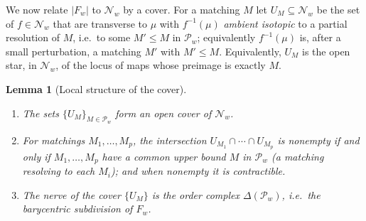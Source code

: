 \documentclass[11pt]{article}
\newtheorem{lemma}{Lemma}
\theoremstyle{definition}
\theoremstyle{remark}
\begin{document}
We now relate $|F_w|$ to $\mathcal N_w$ by a cover. For a matching $M$ let
$U_M\subseteq\mathcal N_w$ be the set of $f\in\mathcal N_w$ that are transverse to
$\mu$ with $f^{-1}(\mu)$ \emph{ambient isotopic} to a partial resolution of $M$,
i.e.\ to some $M'\le M$ in $\mathcal P_w$; equivalently $f^{-1}(\mu)$ is, after a
small perturbation, a matching $M'$ with $M'\le M$. Equivalently, $U_M$ is the
open star, in $\mathcal N_w$, of the locus of maps whose preimage is exactly $M$.

\begin{lemma}[Local structure of the cover]\label{lem:cover}
\leavevmode
\begin{enumerate}
\item[(a)] The sets $\{U_M\}_{M\in\mathcal P_w}$ form an open cover of $\mathcal
N_w$.
\item[(b)] For matchings $M_1,\dots,M_p$, the intersection $U_{M_1}\cap\cdots\cap
U_{M_p}$ is nonempty if and only if $M_1,\dots,M_p$ have a common upper bound
$M$ in $\mathcal P_w$ (a matching resolving to each $M_i$); and when nonempty it
is contractible.
\item[(c)] The nerve of the cover $\{U_M\}$ is the order complex
$\Delta(\mathcal P_w)$, i.e.\ the barycentric subdivision of $F_w$.
\end{enumerate}
\end{lemma}
\end{document}
